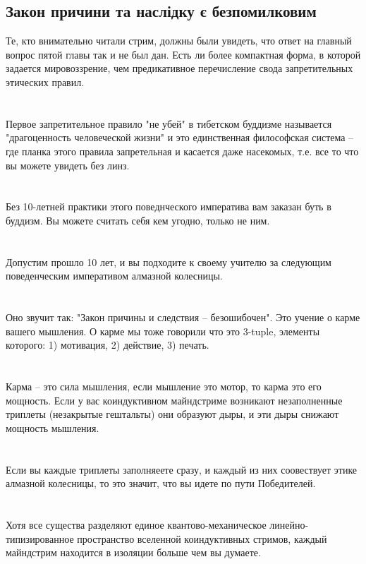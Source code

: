 \subsection{Закон причини та наслідку є безпомилковим}

Те, кто внимательно читали стрим, должны были увидеть, что ответ на главный вопрос пятой главы так и не был дан. Есть ли более компактная форма, в которой задается мировоззрение, чем предикативное перечисление свода запретительных этических правил.\\
\\
\\
Первое запретительное правило "не убей" в тибетском буддизме называется "драгоценность человеческой жизни" и это единственная философская система -- где планка этого правила запретельная и касается даже насекомых, т.е. все то что вы можете увидеть без линз.\\
\\
\\
Без 10-летней практики этого поведнческого императива вам заказан буть в буддизм. Вы можете считать себя кем угодно, только не ним.\\
\\
\\
Допустим прошло 10 лет, и вы подходите к своему учителю за следующим поведенческим императивом алмазной колесницы.\\
\\
\\
Оно звучит так: "Закон причины и следствия -- безошибочен". Это учение о карме вашего мышления. О карме мы тоже говорили что это 3-tuple, элементы которого: 1) мотивация, 2) действие, 3) печать.\\
\\
\\
Карма -- это сила мышления, если мышление это мотор, то карма это его мощность. Если у вас коиндуктивном майндстриме возникают незаполненные триплеты (незакрытые гештальты) они образуют дыры, и эти дыры снижают мощность мышления.\\
\\
\\
Если вы каждые триплеты заполняеете сразу, и каждый из них соовествует этике алмазной колесницы, то это значит, что вы идете по пути Победителей.\\
\\
\\
Хотя все существа разделяют единое квантово-механическое линейно-типизированное пространство вселенной коиндуктивных стримов, каждый майндстрим находится в изоляции больше чем вы думаете.\\
